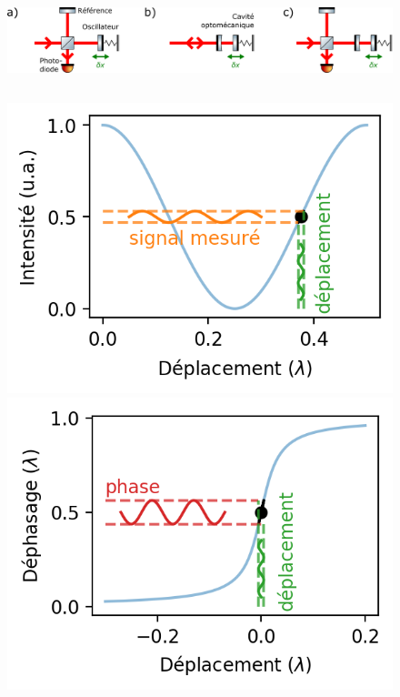\documentclass[12pt,a4paper]{article}
\begin{document}
\begin{figure}
\center
\includegraphics[height=75pt]{figures/detection_scheme.png}

\includegraphics[scale=0.75]{figures/michelson_response.png}
\includegraphics[scale=0.75]{figures/cavity_phase_response_ppt.png}

\end{figure}
\end{document}
